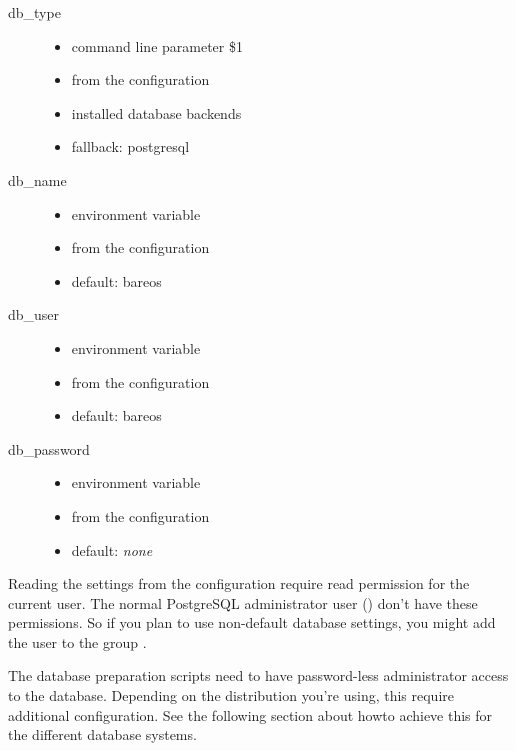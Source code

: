 \begin{description}
    \item[db\_type] \hfill
        \begin{itemize}
            \item command line parameter \$1
            \item {} from the configuration
            \item installed database backends
            \item fallback: postgresql
        \end{itemize}
    \item[db\_name] \hfill
        \begin{itemize}
            \item environment variable 
            \item {} from the configuration
            \item default: bareos
        \end{itemize}
    \item[db\_user] \hfill
        \begin{itemize}
            \item environment variable 
            \item {} from the configuration
            \item default: bareos
        \end{itemize}
    \item[db\_password] \hfill
        \begin{itemize}
            \item environment variable 
            \item {} from the configuration
            \item default: \textit{none}
        \end{itemize}
\end{description}

Reading the settings from the configuration require read permission for the current user.
The normal PostgreSQL administrator user () don't have these permissions.
So if you plan to use non-default database settings, you might add the user  to the group .

The database preparation scripts need to have password-less administrator access to the database.
Depending on the distribution you're using, this require additional configuration.
See the following section about howto achieve this for the different database systems.


